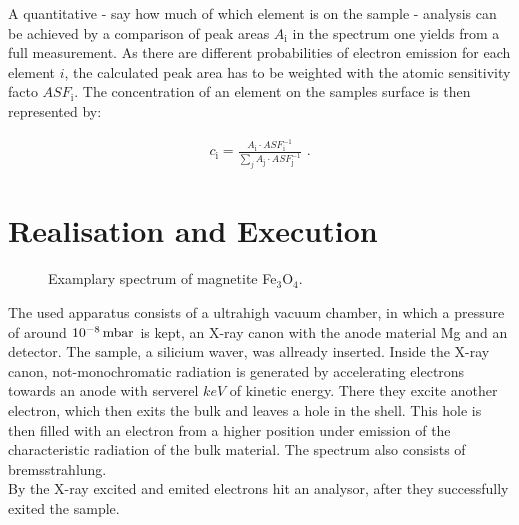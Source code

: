 \documentclass[numbers=noenddot,a4paper,notitlepage,twoside,BCOR15mm]{article}
\newcommand{\tenpo}[1]{ 10^{#1}}
\newcommand{\ix}[1]{_\text{#1}}
\begin{document}
			A quantitative - say how much of which element is on the sample - analysis can be achieved by a comparison of peak areas $A\ix{i}$ in the spectrum one yields from a full measurement. As there are different probabilities of electron emission for each element $i$, the calculated peak area has to be weighted with the atomic sensitivity facto $ASF\ix{i}$. The concentration of an element on the samples surface is then represented by:

				\begin{align}
					c\ix{i}=\frac{A\ix{i}\cdot ASF\ix{i}^{-1}}{\sum_{j}A\ix{j}\cdot ASF\ix{j}^{-1}} \,\,.
				\end{align}

	\clearpage
	\section{Realisation and Execution}

			\begin{figure}[h]
				\centering
				\caption{Examplary spectrum of magnetite Fe$_3$O$_4$.}
				\label{img:spektr}
			\end{figure}

		The used apparatus consists of a ultrahigh vacuum chamber, in which a pressure of around $\unit[\tenpo{-8}]{mbar}$ is kept, an X-ray canon with the anode material Mg and an detector. The sample, a silicium waver, was allready inserted. Inside the X-ray canon, not-monochromatic radiation is generated by accelerating electrons towards an anode with serverel $\unit{keV}$ of kinetic energy. There they excite another electron, which then exits the bulk and leaves a hole in the shell. This hole is then filled with an electron from a higher position under emission of the characteristic radiation of the bulk material. The spectrum also consists of bremsstrahlung.\\
		By the X-ray excited and emited electrons hit an analysor, after they successfully exited the sample.\\
\end{document}
